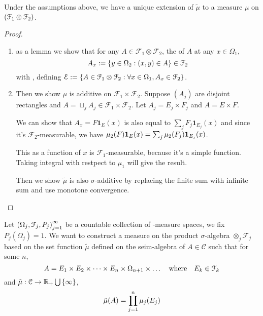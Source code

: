 \begin{thm}
    Under the assumptions above, we have a unique extension of \(\tilde{\mu}\) to a measure \(\mu\) on \(\pqty{\mathcal{F}_{1} \otimes \mathcal{F}_{2} }\). 
\end{thm}
\begin{proof}
    \begin{enumerate}
        \item as a lemma we show that for any \(A \in \mathcal{F}_{1}\otimes \mathcal{F}_{2} \), the  of \(A\) at any \(x \in \Omega_{1}\), 
        \begin{equation*}
            A_{x}:= \Bqty{y\in \Omega_{2}: (x,y) \in A}  \in \mathcal{F}_{2}
        \end{equation*}
        with , defining \(\mathcal{E} := \Bqty{A \in \mathcal{F}_{1} \otimes \mathcal{F}_{2} : \forall x \in\Omega_{1} , A_{x} \in \mathcal{F}_{2}}\).
        
        \item
        Then we show \(\mu\) is additive on \(\mathcal{F}_{1} \times \mathcal{F}_{2}\). Suppose \((A_{j})\) are disjoint rectangles and \( A = \sqcup_{j} A_{j} \in \mathcal{F}_{1}\times \mathcal{F}_{2}\). Let \(A_{j} = E_{j} \times F_{j}\) and \(A = E\times F\).
        
        We can show that \(A_{x} = F \mathbf{1}_{E}(x)  \) is also equal to \(\sum_{j} F_{j} \mathbf{1}_{E_{j}}(x)\) and since it's \(\mathcal{F}_{2}\)-measurable, we have \(\mu_{2}(F)\mathbf{1}_{E}(x) = \sum_{j} \mu_{2}\pqty{F_{j}} \mathbf{1}_{E_{j}}(x)\).

    This as a function of \(x\) is \(\mathcal{F}_{1}\)-measurable, because it's a simple function. Taking integral with restpect to \(\mu_{1}\) will give the result.
     
    Then we show \(\tilde{\mu}\) is also \(\sigma\)-additive by replacing the finite sum with infinite sum and use monotone convergence.
    \end{enumerate}
\end{proof}



Let \(\pqty{\Omega_{j}, \mathcal{F}_{j}, P_{j}}_{j = 1}^{\infty}\) be a countable collection of -measure spaces, we fix \(P_{j}(\Omega_{j}) = 1\). We want to construct a measure on the product \(\sigma\)-algebra \(\otimes_{j} \mathcal{F}_{j}\) based on the set function \(\tilde{\mu}\) defined on the seim-algebra of  \(A \in \mathcal{C}\) such that for some \(n\), 
\begin{equation*}
    A = E_{1} \times E_{2} \times \dots \times E_{n} \times \Omega_{n+1} \times \dots \qq{where} E_{k} \in \mathcal{F}_{k}
\end{equation*}
and \(\tilde{\mu}: \mathcal{C} \to \mathbb{R}_{+}\cup \Bqty{\infty}\),
\begin{equation*}
    \tilde{\mu}(A) = \prod_{j = 1}^{n} \mu_{j}\pqty{E_{j}}
\end{equation*}

